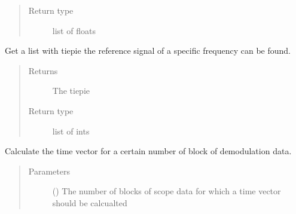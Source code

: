 \documentclass[letterpaper,10pt,english]{sphinxmanual}
\begin{document}
\begin{fulllineitems}
\begin{fulllineitems}
\begin{quote}
\begin{description}
\item[{Return type}] \leavevmode
\sphinxAtStartPar
list of floats

\end{description}\end{quote}

\end{fulllineitems}


\begin{fulllineitems}
\label{\detokenize{index:TiePieLCR_settings.TiePieLCR_settings.get_demodulation_tiepies}}
\sphinxAtStartPar
Get a list with tiepie the reference signal of a specific frequency can be found.
\begin{quote}\begin{description}
\item[{Returns}] \leavevmode
\sphinxAtStartPar
The tiepie

\item[{Return type}] \leavevmode
\sphinxAtStartPar
list of ints

\end{description}\end{quote}

\end{fulllineitems}


\begin{fulllineitems}
\label{\detokenize{index:TiePieLCR_settings.TiePieLCR_settings.get_demodulation_time_vector}}
\sphinxAtStartPar
Calculate the time vector for a certain number of block of demodulation data.
\begin{quote}\begin{description}
\item[{Parameters}] \leavevmode
\sphinxAtStartPar
{} () \textendash{} The number of blocks of scope data for which a time vector should be calcualted


\end{description}
\end{quote}
\end{fulllineitems}
\end{fulllineitems}
\end{document}
